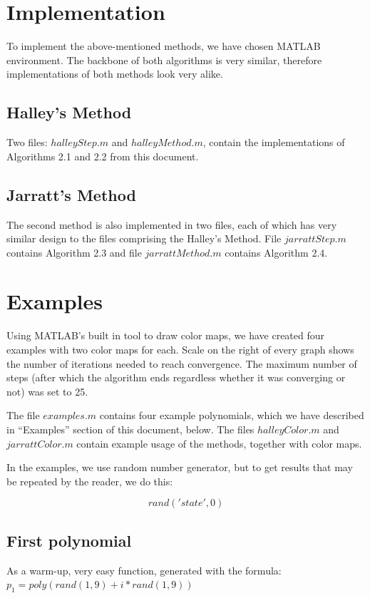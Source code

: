 \documentclass{article}
\begin{document}
\section{Implementation}

To implement the above-mentioned methods, we have chosen MATLAB environment. The backbone of both
algorithms is very similar, therefore implementations of both methods look very alike.

\subsection{Halley's Method}

Two files: $halleyStep.m$ and $halleyMethod.m$, contain the implementations of Algorithms 2.1 and
2.2 from this document.

\subsection{Jarratt's Method}

The second method is also implemented in two files, each of which has very similar design to the
files comprising the Halley's Method. File $jarrattStep.m$ contains Algorithm 2.3 and file
$jarrattMethod.m$ contains Algorithm 2.4.

\section{Examples}

Using MATLAB's built in tool to draw color maps, we have created four examples with two color maps
for each. Scale on the right of every graph shows the number of iterations needed to reach
convergence. The maximum number of steps (after which the algorithm ends regardless whether it
was converging or not) was set to 25.

The file $examples.m$ contains four example polynomials, which we have described in ``Examples''
section of this document, below. The files $halleyColor.m$ and $jarrattColor.m$ contain example
usage of the methods, together with color maps.

In the examples, we use random number generator, but to get results that may be repeated by the
reader, we do this:

\[rand('state',0)\]

\subsection{First polynomial}
As a warm-up, very easy function, generated with the formula: $p_1 = poly(rand(1,9) + i*rand(1,9))$
\end{document}
